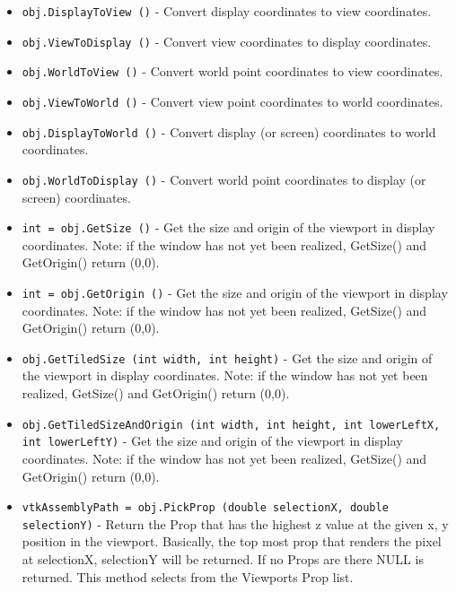 \begin{itemize}
\item  \verb|obj.DisplayToView ()| -  Convert display coordinates to view coordinates.

\item  \verb|obj.ViewToDisplay ()| -  Convert view coordinates to display coordinates.

\item  \verb|obj.WorldToView ()| -  Convert world point coordinates to view coordinates.

\item  \verb|obj.ViewToWorld ()| -  Convert view point coordinates to world coordinates.

\item  \verb|obj.DisplayToWorld ()| -  Convert display (or screen) coordinates to world coordinates.

\item  \verb|obj.WorldToDisplay ()| -  Convert world point coordinates to display (or screen) coordinates.

\item  \verb|int = obj.GetSize ()| -  Get the size and origin of the viewport in display coordinates. Note:
 if the window has not yet been realized, GetSize() and GetOrigin()
 return (0,0).

\item  \verb|int = obj.GetOrigin ()| -  Get the size and origin of the viewport in display coordinates. Note:
 if the window has not yet been realized, GetSize() and GetOrigin()
 return (0,0).

\item  \verb|obj.GetTiledSize (int width, int height)| -  Get the size and origin of the viewport in display coordinates. Note:
 if the window has not yet been realized, GetSize() and GetOrigin()
 return (0,0).

\item  \verb|obj.GetTiledSizeAndOrigin (int width, int height, int lowerLeftX, int lowerLeftY)| -  Get the size and origin of the viewport in display coordinates. Note:
 if the window has not yet been realized, GetSize() and GetOrigin()
 return (0,0).

\item  \verb|vtkAssemblyPath = obj.PickProp (double selectionX, double selectionY)| -  Return the Prop that has the highest z value at the given x, y position
 in the viewport.  Basically, the top most prop that renders the pixel at
 selectionX, selectionY will be returned.  If no Props are there NULL is
 returned.  This method selects from the Viewports Prop list.


\end{itemize}
